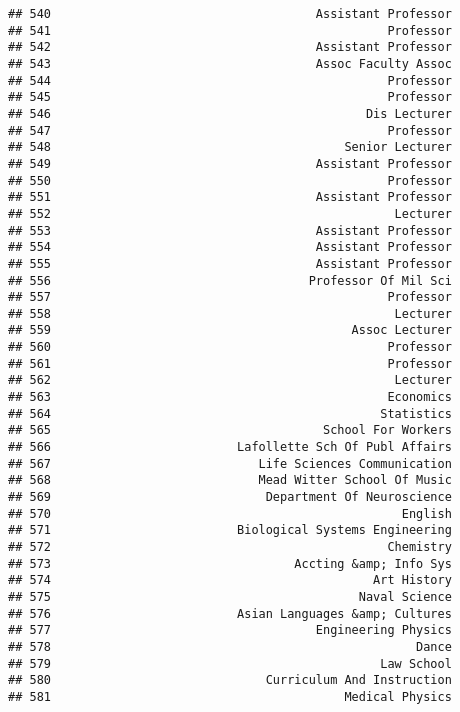 \documentclass[
]{article}
\begin{document}
\begin{verbatim}
## 540                                     Assistant Professor
## 541                                               Professor
## 542                                     Assistant Professor
## 543                                     Assoc Faculty Assoc
## 544                                               Professor
## 545                                               Professor
## 546                                            Dis Lecturer
## 547                                               Professor
## 548                                         Senior Lecturer
## 549                                     Assistant Professor
## 550                                               Professor
## 551                                     Assistant Professor
## 552                                                Lecturer
## 553                                     Assistant Professor
## 554                                     Assistant Professor
## 555                                     Assistant Professor
## 556                                    Professor Of Mil Sci
## 557                                               Professor
## 558                                                Lecturer
## 559                                          Assoc Lecturer
## 560                                               Professor
## 561                                               Professor
## 562                                                Lecturer
## 563                                               Economics
## 564                                              Statistics
## 565                                      School For Workers
## 566                          Lafollette Sch Of Publ Affairs
## 567                             Life Sciences Communication
## 568                             Mead Witter School Of Music
## 569                              Department Of Neuroscience
## 570                                                 English
## 571                          Biological Systems Engineering
## 572                                               Chemistry
## 573                                  Accting &amp; Info Sys
## 574                                             Art History
## 575                                           Naval Science
## 576                          Asian Languages &amp; Cultures
## 577                                     Engineering Physics
## 578                                                   Dance
## 579                                              Law School
## 580                              Curriculum And Instruction
## 581                                         Medical Physics

\end{verbatim}
\end{document}

